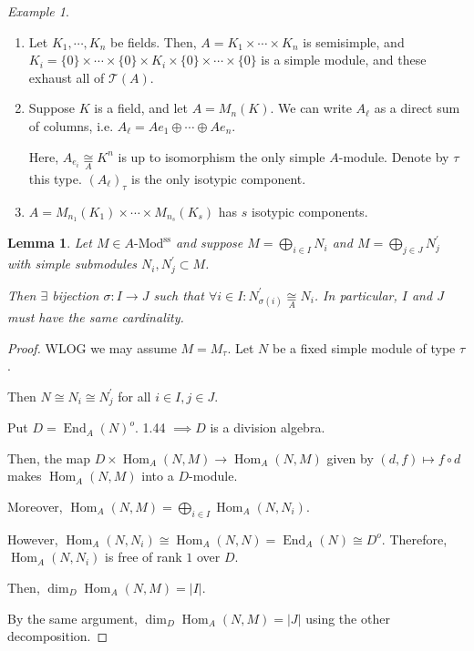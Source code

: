 \documentclass{article}
\theoremstyle{definition}
\theoremstyle{plain}
\newtheorem{lemma}[theorem]{Lemma}
\theoremstyle{remark}
\newtheorem*{example*}{Example}
\begin{document}
    \begin{example*}
        \begin{enumerate}[label=\arabic*)]
            \item Let \(K_1 , \cdots , K_n\) be fields. Then, \(A = K_1 \times \cdots \times K_n\) is semisimple, and \(K_i = \{ 0 \} \times \cdots \times \{ 0 \} \times K_i \times \{ 0 \} \times \cdots \times \{ 0 \} \) is a simple module, and these exhaust all of \(\mathcal{T}(A)\).  
            
            \item Suppose \(K\) is a field, and let \(A = M_n(K)\). We can write \(A_\ell\) as a direct sum of columns, i.e. \(A_\ell = Ae_1 \oplus \cdots \oplus Ae_n\).
            
            Here, \(A_{e_i} \underset{A}{\cong} K^n\) is up to isomorphism the only simple \(A\)-module. Denote by \(\tau\) this type. \((A_\ell)_{\tau}\) is the only isotypic component.

            \item \(A = M_{n_1} (K_1) \times \cdots \times M_{n_s}(K_s)\) has \(s\) isotypic components.
        \end{enumerate} 
    \end{example*}

    \begin{lemma}
        Let \(M \in A\text{-Mod}^{\text{ss}}\) and suppose \(M = \bigoplus_{i\in I} N_i\) and \(M = \bigoplus_{j\in J} N_j^{\prime}\) with simple submodules \(N_i , N_j^{\prime} \subset M\).
        
        Then \(\exists\) bijection \(\sigma : I \to J\) such that \(\forall i\in I : N^{\prime}_{\sigma(i)} \underset{A}{\cong} N_i\). In particular, \(I\) and \(J\) must have the same cardinality.
    \end{lemma}

    \begin{proof}
        WLOG we may assume \(M = M_{\tau}\). Let \(N\) be a fixed simple module of type \(\tau\).

        Then \(N \cong N_i \cong N_j^{\prime}\) for all \(i\in I, j \in J\).

        Put \(D = \operatorname{End}_A(N)^o\). 1.44 \(\implies D\) is a division algebra.

        Then, the map \(D \times \operatorname{Hom}_A(N,M) \to \operatorname{Hom}_A(N,M)\) given by \((d,f) \mapsto f \circ d\) makes \(\operatorname{Hom}_A(N,M)\) into a \(D\)-module.
        
        Moreover, \(\operatorname{Hom}_A(N, M) = \bigoplus_{i\in I} \operatorname{Hom}_A (N, N_i)\).
        
        However, \(\operatorname{Hom}_A(N, N_i) \cong \operatorname{Hom}_A(N,N) = \operatorname{End}_A(N) \cong D^o\). Therefore, \(\operatorname{Hom}_A(N, N_i)\) is free of rank \(1\) over \(D\).
        
        Then, \(\dim_D \operatorname{Hom}_A(N, M) = \vert I \vert\).

        By the same argument, \(\dim_D \operatorname{Hom}_A(N, M) = \vert J \vert\) using the other decomposition.
    \end{proof}
\end{document}
